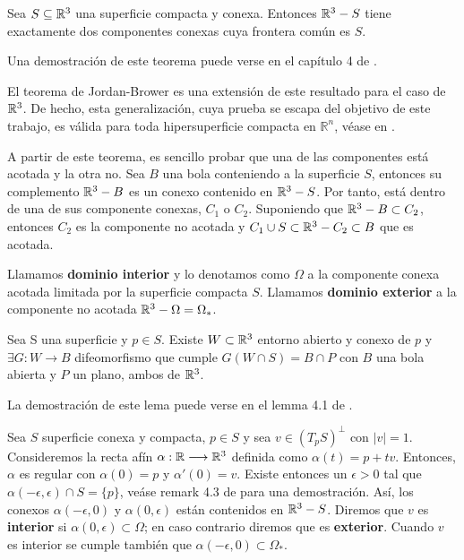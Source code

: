 \begin{theorem}
Sea $S \subseteq \mathbb{R}^3$ una superficie compacta y conexa. Entonces $\mathbb{R}^3 - S$ tiene exactamente dos componentes conexas cuya frontera común es $S$.
\end{theorem}

Una demostración de este teorema puede verse en el capítulo 4 de \cite{montielrosbook}.

El teorema de Jordan-Brower es una extensión de este resultado para el caso de $\mathbb{R}^3$. De hecho, esta generalización, cuya prueba se escapa del objetivo de este trabajo, es válida para toda hipersuperficie compacta en $\mathbb{R}^n$, véase en \cite{paperchicago}.

A partir de este teorema, es sencillo probar que una de las componentes está acotada y la otra no. Sea $B$ una bola conteniendo a la superficie $S$, entonces su complemento $\mathbb{R}^3 - B$ es un conexo contenido en $\mathbb{R}^3 - S$. Por tanto, está dentro de una de sus componente conexas, $C_1$ o $C_2$. Suponiendo que $\mathbb{R}^3 - B \subset C_2$, entonces $C_2$ es la componente no acotada y $C_1 \cup S \subset \mathbb{R}^3 - C_2 \subset B$ que es acotada. 

\begin{definition}
Llamamos \textbf{dominio interior} y lo denotamos como $\Omega$ a la componente conexa acotada limitada por la superficie compacta $S$. Llamamos \textbf{dominio exterior} a la componente no acotada $\mathbb{R}^3 - \Omega=\Omega_{*}$.
\end{definition}

\begin{lemma}
Sea S una superficie y $p \in S$. Existe $W \subset \mathbb{R}^3$ entorno abierto y conexo de $p$ y $\exists G: W \longrightarrow B$ difeomorfismo que cumple $G(W\cap S) = B\cap P$ con $B$ una bola abierta y $P$ un plano, ambos de $\mathbb{R}^3$.
\end{lemma}

La demostración de este lema puede verse en el lemma 4.1 de \cite{montielrosbook}.

\begin{definition}
Sea $S$ superficie conexa y compacta, $p \in S$ y sea $v \in (T_pS)^{\perp}$ con $|v|=1$. Consideremos la recta afín $\alpha: \mathbb{R} \longrightarrow \mathbb{R}^3$ definida como $\alpha(t) = p + tv$. Entonces, $\alpha$ es regular con $\alpha(0)=p$ y $\alpha'(0) = v$. Existe entonces un $\epsilon  >  0$ tal que $\alpha(-\epsilon, \epsilon) \cap S = \{p\}$, veáse remark 4.3 de \cite{montielrosbook} para una demostración. Así, los conexos $\alpha(-\epsilon, 0)$ y $\alpha(0, \epsilon)$ están contenidos en $\mathbb{R}^3 - S$. Diremos que $v$ es \textbf{interior} si $\alpha(0, \epsilon) \subset \Omega$; en caso contrario diremos que es \textbf{exterior}. Cuando $v$ es interior se cumple también que $\alpha(-\epsilon, 0) \subset \Omega_*$.
\end{definition}

